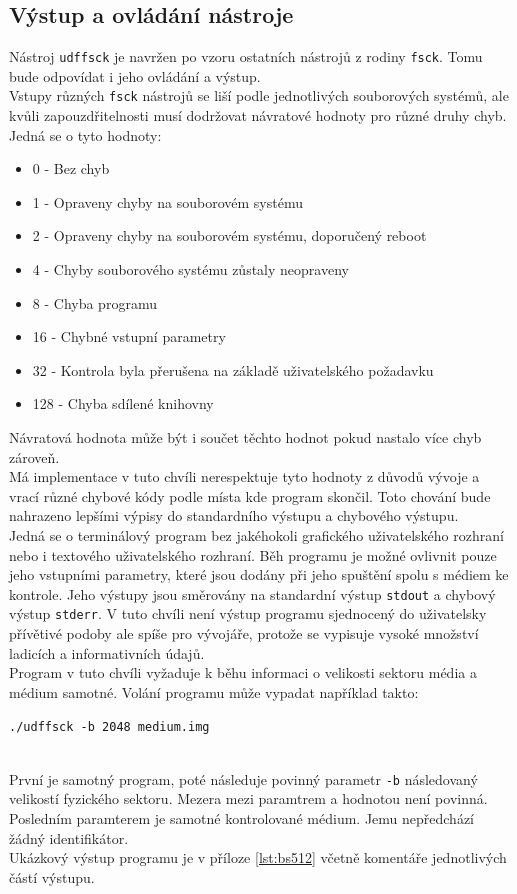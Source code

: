 \subsection{Výstup a ovládání nástroje}
Nástroj \texttt{udffsck} je navržen po vzoru ostatních nástrojů z rodiny \texttt{fsck}. Tomu bude odpovídat i jeho ovládání a výstup.\\
Vstupy různých \texttt{fsck} nástrojů se liší podle jednotlivých souborových systémů, ale kvůli zapouzdřitelnosti musí dodržovat návratové hodnoty pro různé druhy chyb. Jedná se o tyto hodnoty:
\begin{itemize}
    \item 0 - Bez chyb 
    \item 1 - Opraveny chyby na souborovém systému
    \item 2 - Opraveny chyby na souborovém systému, doporučený reboot 
    \item 4 - Chyby souborového systému zůstaly neopraveny
    \item 8 - Chyba programu
    \item 16 - Chybné vstupní parametry
    \item 32 - Kontrola byla přerušena na základě uživatelského požadavku
    \item 128 - Chyba sdílené knihovny
\end{itemize}
Návratová hodnota může být i součet těchto hodnot pokud nastalo více chyb zároveň.\\
Má implementace v tuto chvíli nerespektuje tyto hodnoty z důvodů vývoje a vrací různé chybové kódy podle místa kde program skončil. Toto chování bude nahrazeno lepšími výpisy do standardního výstupu a chybového výstupu.\\
Jedná se o terminálový program bez jakéhokoli grafického uživatelského rozhraní nebo i textového uživatelského rozhraní. Běh programu je možné ovlivnit pouze jeho vstupními parametry, které jsou dodány při jeho spuštění spolu s médiem ke kontrole. Jeho výstupy jsou směrovány na standardní výstup \texttt{stdout} a chybový výstup \texttt{stderr}. V tuto chvíli není výstup programu sjednocený do uživatelsky přívětivé podoby ale spíše pro vývojáře, protože se vypisuje vysoké množství ladicích a informativních údajů.\\
Program v tuto chvíli vyžaduje k běhu informaci o velikosti sektoru média a médium samotné. Volání programu může vypadat například takto:\\ 
\centerline{\texttt{./udffsck -b 2048 medium.img}}\\
První je samotný program, poté následuje povinný parametr \texttt{-b} následovaný velikostí fyzického sektoru. Mezera mezi paramtrem a hodnotou není povinná. Posledním paramterem je samotné kontrolované médium. Jemu nepředchází žádný identifikátor.\\
Ukázkový výstup programu je v příloze \ref{lst:bs512} včetně komentáře jednotlivých částí výstupu. 

